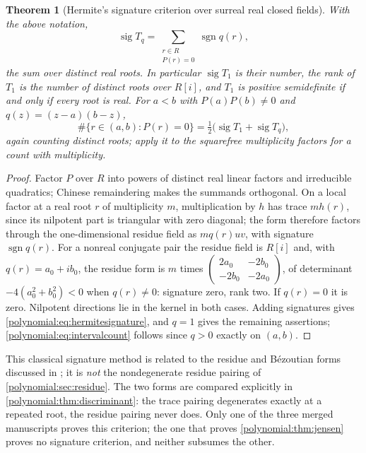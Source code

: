 \documentclass[11pt,letterpaper]{article}
\numberwithin{equation}{section}
\newtheorem{theorem}{Theorem}[section]
\theoremstyle{definition}
\theoremstyle{remark}\newtheorem{remark}[theorem]{Remark}
\newcommand{\sig}{\operatorname{sig}}
\newcommand{\sgn}{\operatorname{sgn}}
\begin{document}
\begin{theorem}[Hermite's signature criterion over surreal real closed fields]
\label{polynomial:thm:hermite}
With the above notation,
\begin{equation}\label{polynomial:eq:hermitesignature}
 \sig T_q=\sum_{\substack{r\in R\\ P(r)=0}}\sgn q(r),
\end{equation}
the sum over \emph{distinct} real roots. In particular $\sig T_1$ is their
number, the rank of $T_1$ is the number of distinct roots over $R[i]$, and
$T_1$ is positive semidefinite if and only if every root is real. For $a<b$
with $P(a)P(b)\ne0$ and $q(z)=(z-a)(b-z)$,
\begin{equation}\label{polynomial:eq:intervalcount}
 \#\{r\in(a,b):P(r)=0\}=\tfrac12\bigl(\sig T_1+\sig T_q\bigr),
\end{equation}
again counting distinct roots; apply it to the squarefree multiplicity factors
for a count with multiplicity.
\end{theorem}
\begin{proof}
Factor $P$ over $R$ into powers of distinct real linear factors and
irreducible quadratics; Chinese remaindering makes the summands orthogonal. On
a local factor at a real root $r$ of multiplicity $m$, multiplication by $h$
has trace $mh(r)$, since its nilpotent part is triangular with zero diagonal;
the form therefore factors through the one-dimensional residue field as
$mq(r)uv$, with signature $\sgn q(r)$. For a nonreal conjugate pair the
residue field is $R[i]$ and, with $q(r)=a_0+ib_0$, the residue form is $m$
times $\begin{pmatrix}2a_0&-2b_0\\-2b_0&-2a_0\end{pmatrix}$, of determinant
$-4(a_0^2+b_0^2)<0$ when $q(r)\ne0$: signature zero, rank two. If $q(r)=0$ it
is zero. Nilpotent directions lie in the kernel in both cases. Adding
signatures gives \eqref{polynomial:eq:hermitesignature}, and $q=1$ gives the
remaining assertions; \eqref{polynomial:eq:intervalcount} follows since $q>0$
exactly on $(a,b)$.
\end{proof}

This classical signature method is related to the residue and B\'ezoutian
forms discussed in \cite{polynomial:BCRS}; it is \emph{not} the nondegenerate
residue pairing of \cref{polynomial:sec:residue}. The two forms are compared
explicitly in \cref{polynomial:thm:discriminant}: the trace pairing degenerates
exactly at a repeated root, the residue pairing never does. Only one of the
three merged manuscripts proves this criterion; the one that proves
\cref{polynomial:thm:jensen} proves no signature criterion, and neither
subsumes the other.
\end{document}
